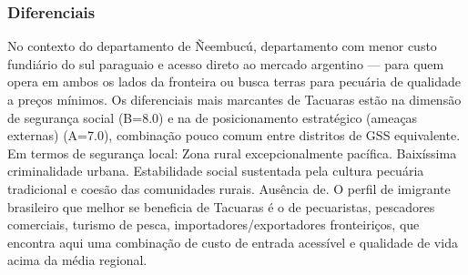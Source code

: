 \subsubsection*{Diferenciais}\label{dif-tacuaras-1213}
No contexto do departamento de Ñeembucú, departamento com menor custo fundiário do sul paraguaio e acesso direto ao mercado argentino — para quem opera em ambos os lados da fronteira ou busca terras para pecuária de qualidade a preços mínimos. Os diferenciais mais marcantes de Tacuaras estão na dimensão de segurança social (B=8.0) e na de posicionamento estratégico (ameaças externas) (A=7.0), combinação pouco comum entre distritos de GSS equivalente. Em termos de segurança local: Zona rural excepcionalmente pacífica. Baixíssima criminalidade urbana. Estabilidade social sustentada pela cultura pecuária tradicional e coesão das comunidades rurais. Ausência de. O perfil de imigrante brasileiro que melhor se beneficia de Tacuaras é o de pecuaristas, pescadores comerciais, turismo de pesca, importadores/exportadores fronteiriços, que encontra aqui uma combinação de custo de entrada acessível e qualidade de vida acima da média regional.
